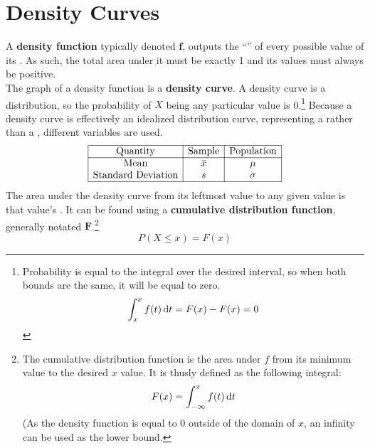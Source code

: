 \documentclass[../AP_Statistics.tex]{subfiles}
\begin{document}
		\section{Density Curves}
			A \textbf{density function} typically denoted $\bm{f}$, outputs the \enquote{} of every possible value of its . As such, the total area under it must be exactly 1 and its values must always be positive. \\
			The graph of a density function is a \textbf{density curve}.
			A density curve is a  distribution, so the probability of $X$ being any particular value is 0.\footnote{Probability is equal to the integral over the desired interval, so when both bounds are the same, it will be equal to zero.\[\int_x^xf(t)\,\mathrm{d} t = F(x) - F(x) = 0\]}
			Because a density curve is effectively an idealized distribution curve, representing a  rather than a , different variables are used. \\ 
			\[\begin{array}{|c|c|c|}\hline
				\mathrm{Quantity} & \text{Sample} & \text{Population} \\\hline
				\mathrm{Mean} & \bar{x} & \mu \\
				\text{Standard Deviation} & s & \sigma \\\hline
			\end{array}\]
			The area under the density curve from its leftmost value to any given value is that value's . It can be found using a \textbf{cumulative distribution function}, generally notated $\bm{F}$.\footnote{The cumulative distribution function is the area under $f$ from its minimum value to the desired $x$ value. It is thusly defined as the following integral:\[F(x) = \int_{-\infty}^xf(t)\,\mathrm{d} t\](As the density function is equal to 0 outside of the domain of $x$, an infinity can be used as the lower bound.}
			\[P(X \le x) = F(x)\]
\end{document}
